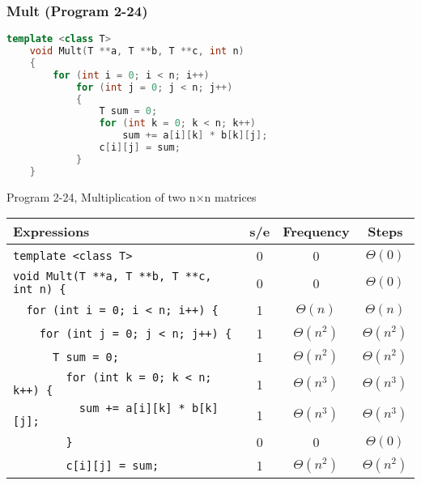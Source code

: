 \documentclass{article}
\begin{document}
\subsubsection{Mult (Program 2-24)}
\begin{lstlisting}[language=C++]
    template <class T>
    void Mult(T **a, T **b, T **c, int n)
    {
        for (int i = 0; i < n; i++)
            for (int j = 0; j < n; j++)
            {
                T sum = 0;
                for (int k = 0; k < n; k++)
                    sum += a[i][k] * b[k][j];
                c[i][j] = sum;
            }
    }
\end{lstlisting}
\begin{center}
    Program 2-24, Multiplication of two n×n matrices
\end{center}
\begin{table}[H]
    \centering
    \begin{tabular}{|l|c|c|c|}
        \hline
        Expressions                                    & s/e                                 & Frequency     & Steps         \\
        \hline
        \verb|template <class T>|                      & 0                                   & 0             & $\Theta(0)$   \\
        \verb|void Mult(T **a, T **b, T **c, int n) {| & 0                                   & 0             & $\Theta(0)$   \\
        \verb|  for (int i = 0; i < n; i++) {|         & 1                                   & $\Theta(n)$   & $\Theta(n)$   \\
        \verb|    for (int j = 0; j < n; j++) {|       & 1                                   & $\Theta(n^2)$ & $\Theta(n^2)$ \\
        \verb|      T sum = 0;|                        & 1                                   & $\Theta(n^2)$ & $\Theta(n^2)$ \\
        \verb|        for (int k = 0; k < n; k++) {|   & 1                                   & $\Theta(n^3)$ & $\Theta(n^3)$ \\
        \verb|          sum += a[i][k] * b[k][j];|     & 1                                   & $\Theta(n^3)$ & $\Theta(n^3)$ \\
        \verb|        }|                               & 0                                   & 0             & $\Theta(0)$   \\
        \verb|        c[i][j] = sum;|                  & 1                                   & $\Theta(n^2)$ & $\Theta(n^2)$ \\

\end{tabular}
\end{table}
\end{document}
